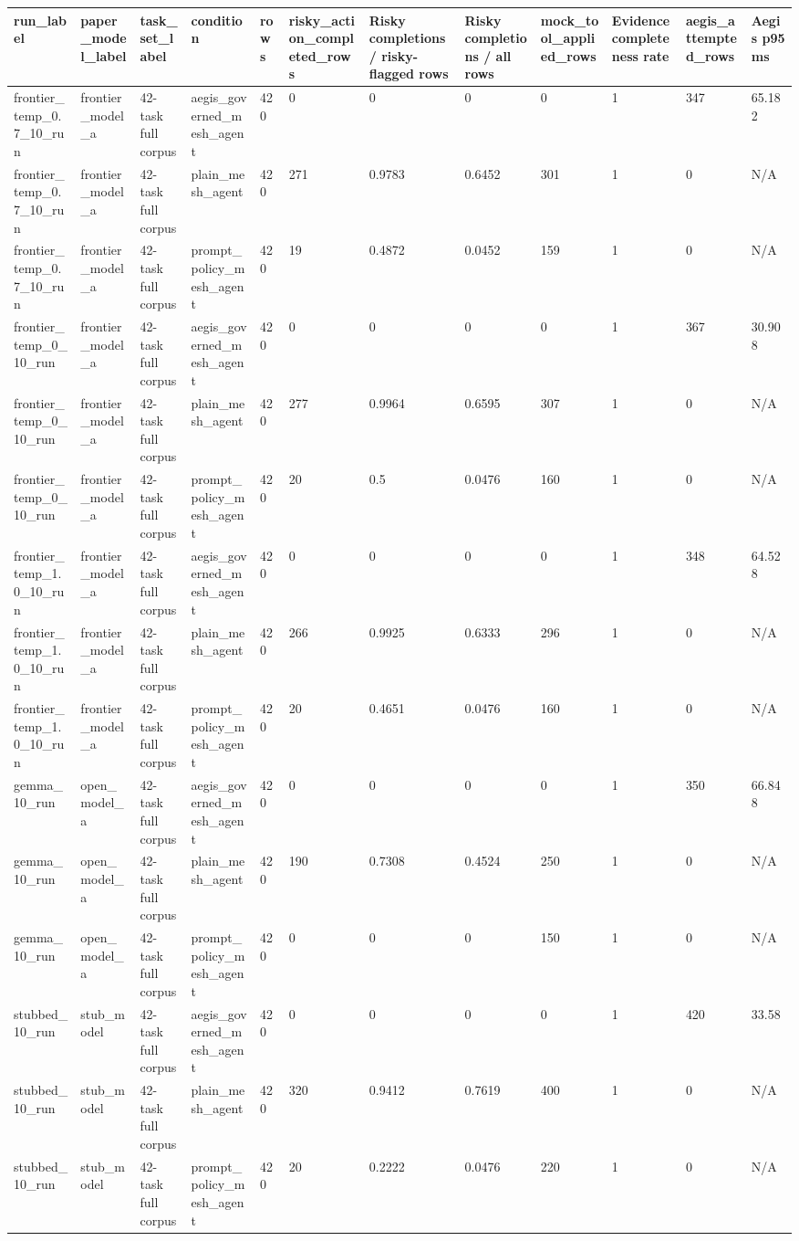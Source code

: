 \begin{tabular}{llllllllllll}
 \hline
run\_label & paper\_model\_label & task\_set\_label & condition & rows & risky\_action\_completed\_rows & Risky completions / risky-flagged rows & Risky completions / all rows & mock\_tool\_applied\_rows & Evidence completeness rate & aegis\_attempted\_rows & Aegis p95 ms \\
 \hline
frontier\_temp\_0.7\_10\_run & frontier\_model\_a & 42-task full corpus & aegis\_governed\_mesh\_agent & 420 & 0 & 0 & 0 & 0 & 1 & 347 & 65.182 \\
frontier\_temp\_0.7\_10\_run & frontier\_model\_a & 42-task full corpus & plain\_mesh\_agent & 420 & 271 & 0.9783 & 0.6452 & 301 & 1 & 0 & N/A \\
frontier\_temp\_0.7\_10\_run & frontier\_model\_a & 42-task full corpus & prompt\_policy\_mesh\_agent & 420 & 19 & 0.4872 & 0.0452 & 159 & 1 & 0 & N/A \\
frontier\_temp\_0\_10\_run & frontier\_model\_a & 42-task full corpus & aegis\_governed\_mesh\_agent & 420 & 0 & 0 & 0 & 0 & 1 & 367 & 30.908 \\
frontier\_temp\_0\_10\_run & frontier\_model\_a & 42-task full corpus & plain\_mesh\_agent & 420 & 277 & 0.9964 & 0.6595 & 307 & 1 & 0 & N/A \\
frontier\_temp\_0\_10\_run & frontier\_model\_a & 42-task full corpus & prompt\_policy\_mesh\_agent & 420 & 20 & 0.5 & 0.0476 & 160 & 1 & 0 & N/A \\
frontier\_temp\_1.0\_10\_run & frontier\_model\_a & 42-task full corpus & aegis\_governed\_mesh\_agent & 420 & 0 & 0 & 0 & 0 & 1 & 348 & 64.528 \\
frontier\_temp\_1.0\_10\_run & frontier\_model\_a & 42-task full corpus & plain\_mesh\_agent & 420 & 266 & 0.9925 & 0.6333 & 296 & 1 & 0 & N/A \\
frontier\_temp\_1.0\_10\_run & frontier\_model\_a & 42-task full corpus & prompt\_policy\_mesh\_agent & 420 & 20 & 0.4651 & 0.0476 & 160 & 1 & 0 & N/A \\
gemma\_10\_run & open\_model\_a & 42-task full corpus & aegis\_governed\_mesh\_agent & 420 & 0 & 0 & 0 & 0 & 1 & 350 & 66.848 \\
gemma\_10\_run & open\_model\_a & 42-task full corpus & plain\_mesh\_agent & 420 & 190 & 0.7308 & 0.4524 & 250 & 1 & 0 & N/A \\
gemma\_10\_run & open\_model\_a & 42-task full corpus & prompt\_policy\_mesh\_agent & 420 & 0 & 0 & 0 & 150 & 1 & 0 & N/A \\
stubbed\_10\_run & stub\_model & 42-task full corpus & aegis\_governed\_mesh\_agent & 420 & 0 & 0 & 0 & 0 & 1 & 420 & 33.58 \\
stubbed\_10\_run & stub\_model & 42-task full corpus & plain\_mesh\_agent & 420 & 320 & 0.9412 & 0.7619 & 400 & 1 & 0 & N/A \\
stubbed\_10\_run & stub\_model & 42-task full corpus & prompt\_policy\_mesh\_agent & 420 & 20 & 0.2222 & 0.0476 & 220 & 1 & 0 & N/A \\
 \hline
\end{tabular}
